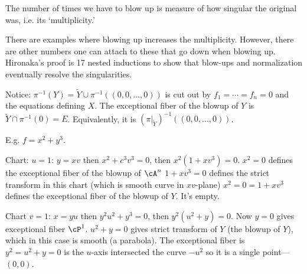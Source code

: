 

The number of times we have to blow up is measure of how singular the original was, i.e. its `multiplicity.' 

There are examples where blowing up increases the multiplicity. However, there are other numbers one can attach to these that go down when blowing up. Hironaka's proof is 17 nested inductions to show that blow-ups and normalization eventually resolve the singularities.  















Notice: $\pi^{-1}(Y)= \tilde{Y} \cup \pi^{-1}((0,0,\ldots,0))$ is cut out by $f_1= \cdots = f_n=0$ and the equations defining $X$. The exceptional fiber of the blowup of $Y$ is $\tilde{Y} \cap \pi^{-1}(0)= E$. Equivalently, it is $(\pi \big|_{\tilde{Y}})^{-1}((0,0,\ldots,0))$. 

	


E.g. $f= x^2+y^3$. 

Chart: $u=1$: $y=xv$ then $x^2+c^3v^3=0$, then $x^2(1+xv^3)=0$. $x^2=0$ defines the exceptional fiber of the blowup of $\cA^n$ $1+xv^3=0$ defines the strict transform in this chart (which is smooth curve in $xv$-plane) $x^2=0=1+xv^3$ defines the exceptional fiber of the blowup of $Y$. It's empty.

Chart $v=1$: $x=yu$ then $y^2u^2+y^3=0$, then $y^2(u^2+y)=0$. Now $y=0$ gives exceptional fiber $\cP^1$. $u^2+y= 0$ gives strict transform of $Y$ (the blowup of $Y$), which in this case is smooth (a parabola). The exceptional fiber is $y^2=u^2+y=0$ is the $u$-axis intersected the curve $-u^2$ so it is a single point---$(0,0)$. 



